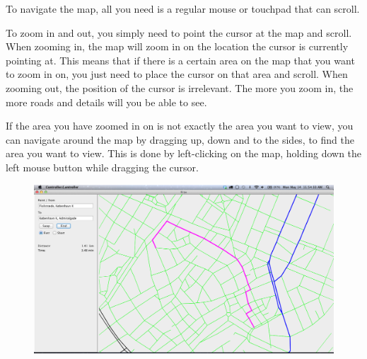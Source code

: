 To navigate the map, all you need is a regular mouse or touchpad that can scroll.

To zoom in and out, you simply need to point the cursor at the map and scroll. When zooming in, the map will zoom in on the location the cursor is currently pointing at. This means that if there is a certain area on the map that you want to zoom in on, you just need to place the cursor on that area and scroll. When zooming out, the position of the cursor is irrelevant. The more you zoom in, the more roads and details will you be able to see.

If the area you have zoomed in on is not exactly the area you want to view, you can navigate around the map by dragging up, down and to the sides, to find the area you want to view. This is done by left-clicking on the map, holding down the left mouse button while dragging the cursor. \\
\begin{figure}[htb]
\centering
\includegraphics[scale=0.25]{User_manual/screenshot.png}
\end{figure}
